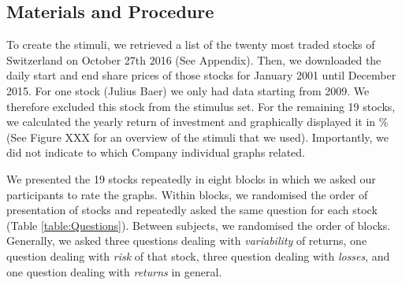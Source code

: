 \documentclass[a4paper,doc, natbib]{apa6} %
\begin{document}
\subsection{Materials and Procedure}
To create the stimuli, we retrieved a list of the twenty most traded stocks of Switzerland on October 27th 2016 (See Appendix). Then, we downloaded the daily start and end share prices of those stocks for January 2001 until December 2015. For one stock (Julius Baer) we only had data starting from 2009. We therefore excluded this stock from the stimulus set. For the remaining 19 stocks, we calculated the yearly return of investment and graphically displayed it in $\%$ (See Figure XXX for an overview of the stimuli that we used). Importantly, we did not indicate to which Company individual graphs related. 

We presented the 19 stocks repeatedly in eight blocks in which we asked our participants to rate the graphs. Within blocks, we randomised the order of presentation of stocks and repeatedly asked the same question for each stock (Table \ref{table:Questions}). Between subjects, we randomised the order of blocks. Generally, we asked three questions dealing with \textit{variability} of returns, one question dealing with \textit{risk} of that stock, three question dealing with \textit{losses}, and one question dealing with \textit{returns} in general. 
\end{document}

